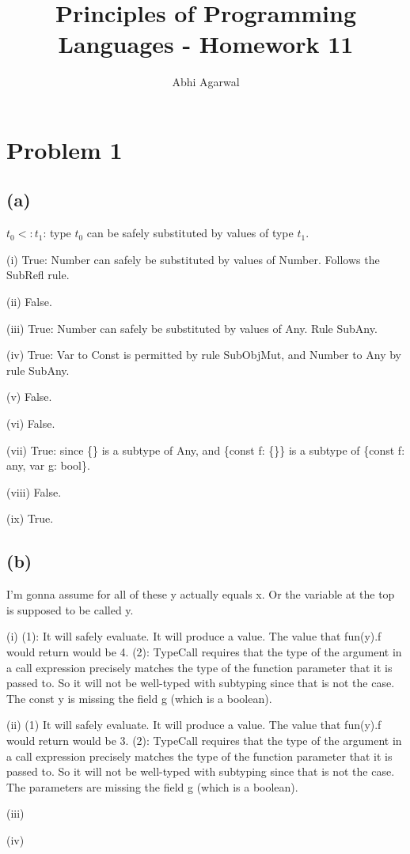 \documentclass[11pt, oneside]{article}
\title{Principles of Programming Languages - Homework 11}
\author{Abhi Agarwal}
\date{}
\begin{document}
\maketitle
\section{Problem 1}
\subsection*{(a)} 

\indent \par $t_0 <: t_1$: type $t_0$ can be safely substituted by values of type $t_1$.
\par (i) True: Number can safely be substituted by values of Number. Follows the SubRefl rule.
\par (ii) False.
\par (iii) True: Number can safely be substituted by values of Any. Rule SubAny.
\par (iv) True: Var to Const is permitted by rule SubObjMut, and Number to Any by rule SubAny.
\par (v) False.
\par (vi) False.
\par (vii) True: since \{\} is a subtype of Any, and \{const f: \{\}\} is a subtype of \{const f: any, var g: bool\}.
\par (viii) False.
\par (ix) True.

\subsection*{(b)} 
\par I'm gonna assume for all of these y actually equals x. Or the variable at the top is supposed to be called y.
\par (i) (1): It will safely evaluate. It will produce a value. The value that fun(y).f would return would be 4. (2): TypeCall requires that the type of the argument in a call expression precisely matches the type of the function parameter that it is passed to. So it will not be well-typed with subtyping since that is not the case. The const y is missing the field g (which is a boolean). 
\par (ii) (1) It will safely evaluate. It will produce a value. The value that fun(y).f would return would be 3. (2): TypeCall requires that the type of the argument in a call expression precisely matches the type of the function parameter that it is passed to. So it will not be well-typed with subtyping since that is not the case. The parameters are missing the field g (which is a boolean).
\par (iii) 
\par (iv) 
\end{document}
